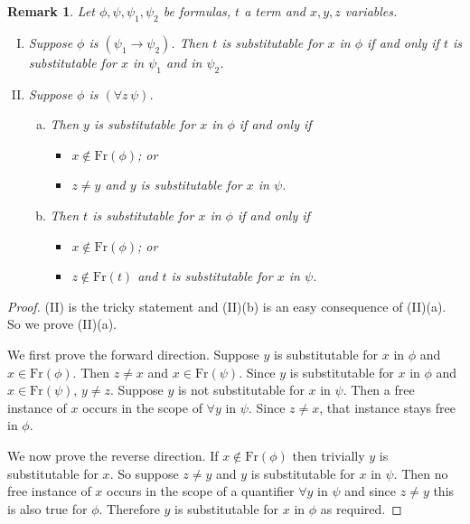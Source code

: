 \documentclass[11pt]{article}
\newcommand{\Fr}{\textrm{Fr}}
\newtheorem{remark}[theorem]{Remark}
\begin{document}
\begin{remark}\label{subrem}
Let $\phi, \psi,\psi_1,\psi_2$ be formulas, $t$ a term and $x,y,z$ variables.
\begin{enumerate}[(I)]
\item
Suppose $\phi$ is $(\psi_1\rightarrow \psi_2)$. Then $t$ is substitutable for $x$ in $\phi$ if and only if $t$ is substitutable for $x$ in $\psi_1$ and in $\psi_2$.
\item Suppose $\phi$ is $(\forall z \,\psi)$.
\begin{enumerate}[(a)]
\item Then $y$ is substitutable for $x$ in $\phi$ if and only if
\begin{itemize}
\item $x\notin \Fr(\phi)$; or
\item $z\neq y$ and $y$ is substitutable for $x$ in $\psi$.
\end{itemize}
\item Then $t$ is substitutable for $x$ in $\phi$ if and only if
\begin{itemize}
\item $x\notin \Fr(\phi)$; or
\item $z\notin\Fr(t)$ and $t$ is substitutable for $x$ in $\psi$.
\end{itemize}
\end{enumerate}
\end{enumerate}
\end{remark}
\begin{proof}
(II) is the tricky statement and (II)(b) is an easy consequence of (II)(a). So we prove (II)(a).

We first prove the forward direction. Suppose $y$ is substitutable for $x$ in $\phi$ and $x\in \Fr(\phi)$. Then $z\neq x$ and $x\in\Fr(\psi)$. Since $y$ is substitutable for $x$ in $\phi$ and $x\in \Fr(\psi)$, $y\neq z$. Suppose $y$ is not substitutable for $x$ in $\psi$. Then a free instance of $x$ occurs in the scope of $\forall y$ in $\psi$. Since $z\neq x$, that instance stays free in $\phi$.

We now prove the reverse direction. If $x\notin \Fr(\phi)$ then trivially $y$ is substitutable for $x$. So suppose $z\neq y$ and $y$ is substitutable for $x$ in $\psi$. Then no free instance of $x$ occurs in the scope of a quantifier $\forall y$ in $\psi$ and since $z\neq y$ this is also true for $\phi$. Therefore $y$ is substitutable for $x$ in $\phi$ as required.
\end{proof}
\end{document}
